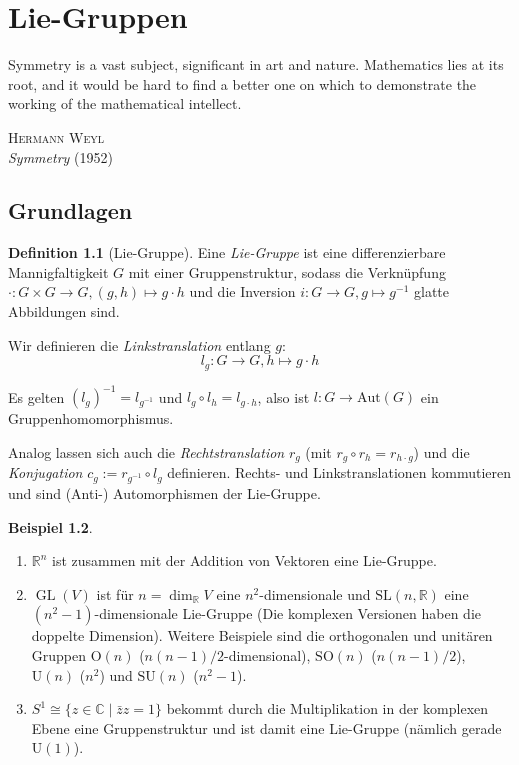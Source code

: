 \documentclass[a4paper]{scrbook}
\numberwithin{equation}{chapter}
\DeclareMathOperator{\GL}{GL}
\newcommand{\R}{\mathbb{R}}
\theoremstyle{definition}
\newtheorem{defn}{Definition}[section]
\newtheorem{bsp}[defn]{Beispiel}
\begin{document}
\chapter{Lie-Gruppen}
\epigraph{Symmetry is a vast subject, significant in art and nature. Mathematics lies at its root, and it would be hard to find a better one on which to demonstrate the working of the mathematical intellect.}{\textsc{Hermann Weyl}\\\emph{Symmetry} (1952)}
	\section{Grundlagen}
		\begin{defn}[Lie-Gruppe]
			Eine \emph{Lie-Gruppe} ist eine differenzierbare Mannigfaltigkeit $G$ mit einer Gruppenstruktur, sodass die Verknüpfung $\cdot\colon G\times G\rightarrow G, (g,h)\mapsto g\cdot h$ und die Inversion ${i\colon G\rightarrow G}, {g\mapsto g^{-1}}$ glatte Abbildungen sind.
			
			Wir definieren die \emph{Linkstranslation} entlang $g$:
			\begin{equation}
				l_g\colon G\to G, h\mapsto g\cdot h
			\end{equation}
			
			Es gelten $(l_g)^{-1}=l_{g^{-1}}$ und $l_g\circ l_h=l_{g\cdot h}$, also ist $l\colon G\rightarrow \mathrm{Aut}(G)$ ein Gruppenhomomorphismus.
			
			Analog lassen sich auch die \emph{Rechtstranslation} $r_g$ (mit $r_g\circ r_h=r_{h\cdot g}$) und die \emph{Konjugation} $c_g:= r_{g^{-1}}\circ l_g$ definieren. Rechts- und Linkstranslationen kommutieren und sind (Anti-) Automorphismen der Lie-Gruppe.
		\end{defn}
		\begin{bsp}\hfill
			\begin{enumerate}[label=(\alph*)]
				\item $\R^n$ ist zusammen mit der Addition von Vektoren eine Lie-Gruppe.
				\item $\GL(V)$ ist für $n=\dim_{\R} V$ eine $n^2$-dimensionale und $\mathrm{SL}(n,\R)$ eine $(n^2-1)$-dimensionale Lie-Gruppe (Die komplexen Versionen haben die doppelte Dimension). Weitere Beispiele sind die orthogonalen und unitären Gruppen $\mathrm{O}(n)$ ($n(n-1)/2$-dimensional), $\mathrm{SO}(n)$ ($n(n-1)/2$), $\mathrm{U}(n)$ ($n^2$) und $\mathrm{SU}(n)$ ($n^2-1$).
				\item $S^1\cong \lbrace z\in \mathbb{C}\mid \bar z z = 1\rbrace$ bekommt durch die Multiplikation in der komplexen Ebene eine Gruppenstruktur und ist damit eine Lie-Gruppe (nämlich gerade $\mathrm{U}(1)$). 
			\end{enumerate}
			
		\end{bsp}
\end{document}
